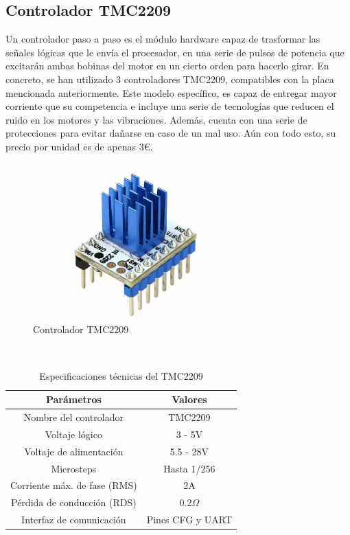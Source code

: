 \newpage
\subsection{Controlador TMC2209}
\label{subsec:controladorPAP}
\noindent Un controlador paso a paso es el módulo hardware capaz de trasformar las señales lógicas que le envía el procesador, en una serie de pulsos de
potencia que excitarán ambas bobinas del motor en un cierto orden para hacerlo girar. 
En concreto, se han utilizado 3 controladores TMC2209, compatibles con la placa mencionada anteriormente. Este modelo específico, es capaz 
de entregar mayor corriente que su competencia e incluye una serie de tecnologías que reducen el ruido en los motores y las vibraciones. Además, 
cuenta con una serie de protecciones para evitar dañarse en caso de un mal uso. Aún con todo esto, su precio por unidad es de apenas 3\euro.
\begin{figure} [h!]
    \begin{center}
      \includegraphics[width=8cm]{figs/TMC2209.jpg}
    \end{center}
    \caption{Controlador TMC2209}
    \label{fig:robSoldering}
\end{figure}\ 

\begin{table}[H]
\begin{center}
\begin{tabular}{|c|c|}
\hline
\textbf{Parámetros} & \textbf{Valores} \\
\hline
Nombre del controlador & TMC2209 \\
Voltaje lógico & 3 - 5V \\
Voltaje de alimentación & 5.5 - 28V \\
Microsteps & Hasta 1/256 \\
Corriente máx. de fase (RMS) & 2A \\
Pérdida de conducción (RDS) & 0.2$\Omega$ \\
Interfaz de comunicación & Pines CFG y UART \\
\hline
\end{tabular}
\caption{Especificaciones técnicas del TMC2209}
\label{cuadro:ejemplo}
\end{center}
\end{table}
    
